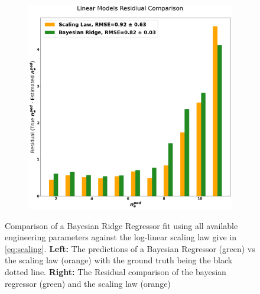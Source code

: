 \documentclass[a4paper, twoside, final, 12pt]{article}
\begin{document}
{\begin{figure}[H]
\begin{subfigure}{0.495\linewidth}
	\end{subfigure}
	\begin{subfigure}{0.495\linewidth}
		\centering
		\includegraphics[scale=0.18]{./src/linear_comp}
	\end{subfigure}\hfill
	\caption{Comparison of a Bayesian Ridge Regressor fit using all available engineering parameters against the log-linear scaling law give in \ref{eq:scaling}. \textbf{Left:} The predictions of a Bayesian Regressor (green) vs the scaling law (orange) with the ground truth being the black dotted line. \textbf{Right:} The Residual comparison of the bayesian regressor (green) and the scaling law (orange) }
	\label{fig:lin_reg}
\end{figure}

}
\end{document}
